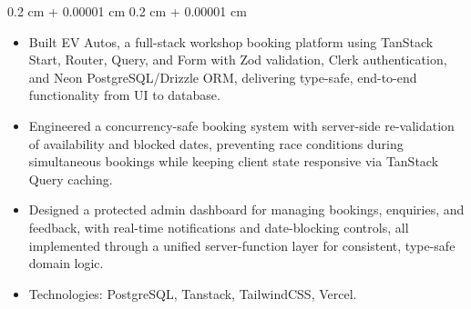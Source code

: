 \documentclass[10pt, letterpaper]{article}
\newenvironment{highlights}{
    \begin{itemize}[
        topsep=0.10 cm,
        parsep=0.10 cm,
        partopsep=0pt,
        itemsep=0pt,
        leftmargin=0.4 cm + 10pt
    ]
}{
    \end{itemize}
} %
\newenvironment{onecolentry}{
    \begin{adjustwidth}{
        0.2 cm + 0.00001 cm
    }{
        0.2 cm + 0.00001 cm
    }
}{
    \end{adjustwidth}
} %
\newenvironment{twocolentry}[2][]{
    \onecolentry
    \def\secondColumn{#2}
    \setcolumnwidth{\fill, 4.5 cm}
    \begin{paracol}{2}
}{
    \switchcolumn \raggedleft \secondColumn
    \end{paracol}
    \endonecolentry
} %
\begin{document}
        \vspace{0.10 cm}
        \begin{onecolentry}
            \begin{highlights}
                \item Built EV Autos, a full-stack workshop booking platform using TanStack Start, Router, Query, and Form with Zod validation, Clerk authentication, and Neon PostgreSQL/Drizzle ORM, delivering type-safe, end-to-end functionality from UI to database.
                \item Engineered a concurrency-safe booking system with server-side re-validation of availability and blocked dates, preventing race conditions during simultaneous bookings while keeping client state responsive via TanStack Query caching.
                \item Designed a protected admin dashboard for managing bookings, enquiries, and feedback, with real-time notifications and date-blocking controls, all implemented through a unified server-function layer for consistent, type-safe domain logic.
                \item Technologies: PostgreSQL, Tanstack, TailwindCSS, Vercel.
            \end{highlights}

            \end{onecolentry}

        \vspace{0.2 cm}
        




\end{document}
